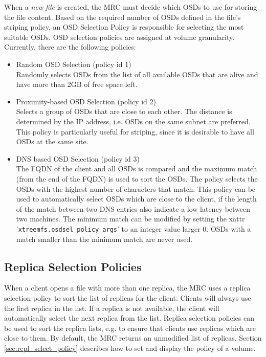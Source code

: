 \documentclass[a4paper,10pt]{book}
\begin{document}
When a \emph{new file} is created, the MRC must decide which OSDs to use for storing the file content. Based on the required number of OSDs defined in the file's striping policy, an OSD Selection Policy is responsible for selecting the most suitable OSDs. OSD selection policies are assigned at volume granularity. Currently, there are the following policies:

\begin{itemize}
 \item Random OSD Selection (policy id 1)\\
 Randomly selects OSDs from the list of all available OSDs that are alive and have more than 2GB of free space left.
 \item Proximity-based OSD Selection (policy id 2)\\
 Selects a group of OSDs that are close to each other. The distance is determined by the IP address, i.e. OSDs on the same subnet are preferred. This policy is particularly useful for striping, since it is desirable to have all OSDs at the same site.
 \item DNS based OSD Selection (policy id 3)\\
 The FQDN of the client and all OSDs is compared and the maximum match (from the end of the FQDN) is used to sort the OSDs. The policy selects the OSDs with the highest number of characters that match. This policy can be used to automatically select OSDs which are close to the client, if the length of the match between two DNS entries also indicate a low latency between two machines. The minimum match can be modified by setting the xattr '\texttt{xtreemfs.osdsel\_policy\_args}' to an integer value larger 0. OSDs with a match smaller than the minimum match are never used.
\end{itemize}

\subsection{Replica Selection Policies}\label{sec:repl_policies}
When a client opens a file with more than one replica, the MRC uses a replica selection policy to sort the list of replicas for the client. Clients will always use the first replica in the list. If a replica is not available, the client will automatically select the next replica from the list. Replica selection policies can be used to sort the replica lists, e.g. to ensure that clients use replicas which are close to them. By default, the MRC returns an unmodified list of replicas. Section \ref{sec:repl_select_policy} describes how to set and display the policy of a volume.
\end{document}
